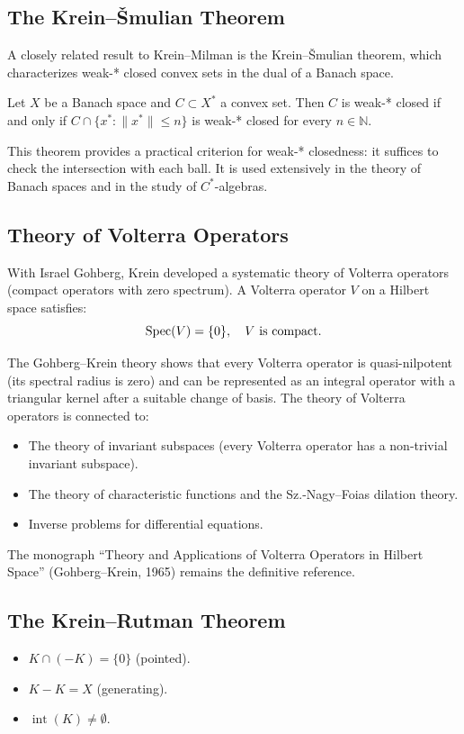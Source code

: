 \subsection{The Krein--{\v S}mulian Theorem}

A closely related result to Krein--Milman is the Krein--{\v S}mulian theorem, which characterizes weak-* closed convex sets in the dual of a Banach space.

\begin{theorem}
Let $X$ be a Banach space and $C \subset X^*$ a convex set. Then $C$ is weak-* closed if and only if $C \cap \{x^* : \|x^*\| \leq n\}$ is weak-* closed for every $n \in \mathbb{N}$.
\end{theorem}

This theorem provides a practical criterion for weak-* closedness: it suffices to check the intersection with each ball. It is used extensively in the theory of Banach spaces and in the study of $C^*$-algebras.

\subsection{Theory of Volterra Operators}

With Israel Gohberg, Krein developed a systematic theory of Volterra operators (compact operators with zero spectrum). A Volterra operator $V$ on a Hilbert space satisfies:
\[
\operatorname{Spec}(V) = \{0\}, \quad V \text{ is compact}.
\]

The Gohberg--Krein theory shows that every Volterra operator is quasi-nilpotent (its spectral radius is zero) and can be represented as an integral operator with a triangular kernel after a suitable change of basis. The theory of Volterra operators is connected to:
\begin{itemize}
    \item The theory of invariant subspaces (every Volterra operator has a non-trivial invariant subspace).
    \item The theory of characteristic functions and the Sz.-Nagy--Foias dilation theory.
    \item Inverse problems for differential equations.
\end{itemize}

The monograph ``Theory and Applications of Volterra Operators in Hilbert Space'' (Gohberg--Krein, 1965) remains the definitive reference.

\subsection{The Krein--Rutman Theorem}
\begin{itemize}
    \item $K \cap (-K) = \{0\}$ (pointed).
    \item $K - K = X$ (generating).
    \item $\operatorname{int}(K) \neq \emptyset$.
\end{itemize}

